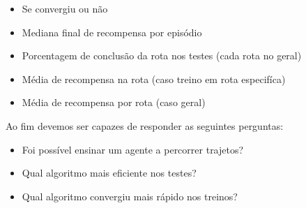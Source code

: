 \begin{itemize}
   \item Se convergiu ou não
   \item Mediana final de recompensa por episódio
   \item Porcentagem de conclusão da rota nos testes (cada rota no geral)
   \item Média de recompensa na rota (caso treino em rota especifíca)
   \item Média de recompensa por rota (caso geral)
\end{itemize}


Ao fim devemos ser capazes de responder as seguintes perguntas:
\begin{itemize}
   \item Foi possível ensinar um agente a percorrer trajetos?
   \item Qual algoritmo mais eficiente nos testes? 
   \item Qual algoritmo convergiu mais rápido nos treinos?
\end{itemize}



